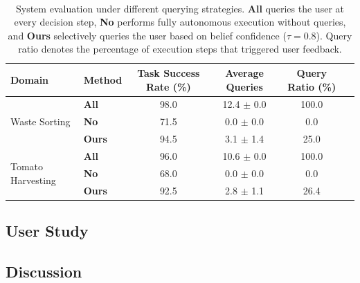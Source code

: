 \begin{table}[t]~\label{{tab:system_eval}}
\centering
\caption{System evaluation under different querying strategies. \textbf{All} queries the user at every decision step, \textbf{No} performs fully autonomous execution without queries, and \textbf{Ours} selectively queries the user based on belief confidence ($\tau=0.8$). Query ratio denotes the percentage of execution steps that triggered user feedback.}
\begin{tabular}{llcccc}
\toprule
\textbf{Domain} & \textbf{Method} & \textbf{Task Success Rate (\%)} & \textbf{Average Queries} & \textbf{Query Ratio (\%)} \\
\midrule

\multirow{3}{*}{Waste Sorting}
& \textbf{All}  & 98.0 & 12.4 $\pm$ 0.0 & 100.0 \\
& \textbf{No}   & 71.5 & 0.0 $\pm$ 0.0  & 0.0 \\
& \textbf{Ours} & 94.5 & 3.1 $\pm$ 1.4  & 25.0 \\
\midrule

\multirow{3}{*}{Tomato Harvesting}
& \textbf{All}  & 96.0 & 10.6 $\pm$ 0.0 & 100.0 \\
& \textbf{No}   & 68.0 & 0.0 $\pm$ 0.0  & 0.0 \\
& \textbf{Ours} & 92.5 & 2.8 $\pm$ 1.1  & 26.4 \\
\bottomrule
\end{tabular}
\end{table}








\subsection{User Study}




\subsection{Discussion}